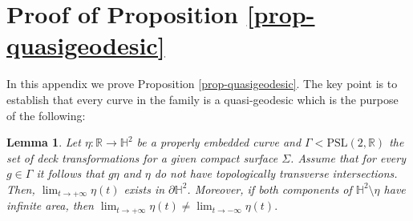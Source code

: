 \documentclass[11pt]{amsart} %
\numberwithin{equation}{section}
\newtheorem{lemma}[equation]{Lemma}
\theoremstyle{remark}
\begin{document}
%

\appendix

\section{Proof of Proposition \ref{prop-quasigeodesic}} 

In this appendix we prove Proposition \ref{prop-quasigeodesic}. The key point is to establish that every curve in the family is a quasi-geodesic which is the purpose of the following:

\begin{lemma}\label{lem-rayinfinity}
Let $\eta: \mathbb{R} \to \mathbb{H}^2$ be a properly embedded curve and $\Gamma < \mathrm{PSL}(2,\mathbb{R})$ the set of deck transformations for a given compact surface $\Sigma$. Assume that for every $g \in \Gamma$ it follows that $g \eta $ and $\eta$ do not have topologically transverse intersections. Then, $\lim_{t\to +\infty} \eta(t)$ exists in $\partial \mathbb{H}^2$. Moreover, if both components of $\mathbb{H}^2 \setminus \eta$ have infinite area, then $\lim_{t\to +\infty} \eta(t) \neq \lim_{t\to -\infty} \eta(t).$
\end{lemma}
\end{document}
